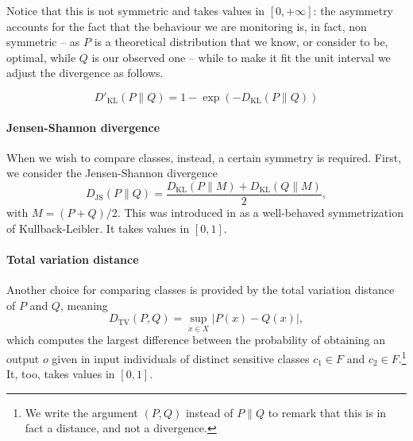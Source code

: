 \documentclass[
]{ceurart}
\begin{document}
Notice that this is not symmetric and takes values in $[0,+\infty]$: the asymmetry accounts for the fact that the behaviour we are monitoring is, in fact, non symmetric -- as $P$ is a theoretical distribution that we know, or consider to be, optimal, while $Q$ is our observed one -- while to make it fit the unit interval we adjust the divergence as follows.

\[D'_{\mathrm{KL}}(P\parallel Q)=1-\exp (- D_{\mathrm{KL}}(P\parallel Q))\]

\paragraph{Jensen-Shannon divergence}
When we wish to compare classes, instead, a certain symmetry is required. First, we consider the Jensen-Shannon divergence 
\[D_{\mathrm{JS}}(P\parallel Q)=\frac{D_{\mathrm{KL}}(P\parallel M)+D_{\mathrm{KL}}(Q\parallel M)}{2},\]
with $M=(P+Q)/2$. This was introduced in \cite{lin_divergence} as a well-behaved symmetrization of Kullback-Leibler. It takes values in $[0,1]$.

\paragraph{Total variation distance}
Another choice for comparing classes is provided by the total variation distance of $P$ and $Q$, meaning
\[D_{\mathrm{TV}}(P, Q)= \sup _{x\in X} \vert P(x) - Q(x)\vert,\]
which computes the largest difference between the probability of obtaining an output $o$ given in input individuals of distinct sensitive classes $c_1\in F$ and $c_2\in F$.\footnote{We write the argument $(P,Q)$ instead of $P\parallel Q$ to remark that this is in fact a distance, and not a divergence.}  It, too, takes values in $[0,1]$. %

%

%
\end{document}
